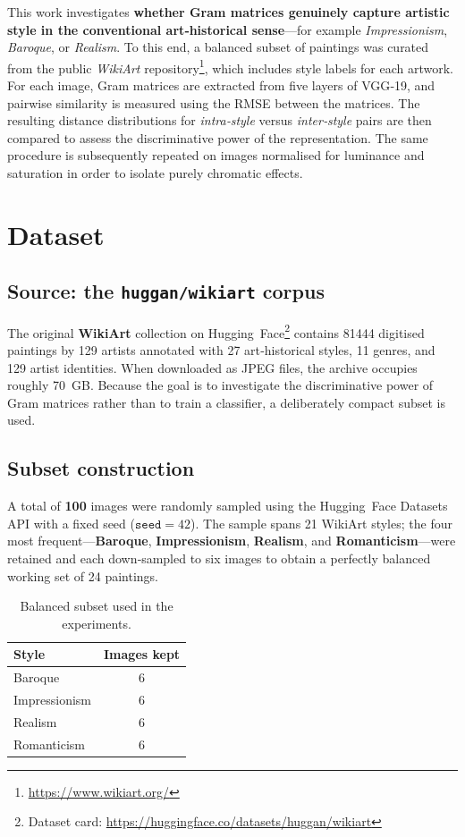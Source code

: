 \documentclass[a4paper,11pt]{article}
\begin{document}
\medskip
This work investigates \textbf{whether Gram matrices genuinely capture artistic style in the conventional art‑historical sense}—for example \emph{Impressionism}, \emph{Baroque}, or \emph{Realism}. To this end, a balanced subset of paintings was curated from the public \emph{WikiArt} repository\footnote{\url{https://www.wikiart.org/}}, which includes style labels for each artwork. For each image, Gram matrices are extracted from five layers of VGG‑19, and pairwise similarity is measured using the RMSE between the matrices. The resulting distance distributions for \emph{intra‑style} versus \emph{inter‑style} pairs are then compared to assess the discriminative power of the representation. The same procedure is subsequently repeated on images normalised for luminance and saturation in order to isolate purely chromatic effects.

\section{Dataset}
\subsection{Source: the \texttt{huggan/wikiart} corpus}
The original \textbf{WikiArt} collection on Hugging~Face\footnote{Dataset card: \url{https://huggingface.co/datasets/huggan/wikiart}} contains \num{81444} digitised paintings by \num{129} artists annotated with \num{27} art‑historical styles, \num{11} genres, and \num{129} artist identities. When downloaded as JPEG files, the archive occupies roughly \SI{70}{GB}. Because the goal is to investigate the discriminative power of Gram matrices rather than to train a classifier, a deliberately compact subset is used.

\subsection{Subset construction}
A total of \textbf{100} images were randomly sampled using the Hugging~Face Datasets API with a fixed seed ($\texttt{seed}=42$). The sample spans \num{21} WikiArt styles; the four most frequent—\textbf{Baroque}, \textbf{Impressionism}, \textbf{Realism}, and \textbf{Romanticism}—were retained and each down‑sampled to six images to obtain a perfectly balanced working set of \num{24} paintings.

\begin{table}[htbp]
    \centering
    \begin{tabular}{lc}
        \toprule
        \textbf{Style} & \textbf{Images kept} \\
        \midrule
        Baroque        & 6 \\
        Impressionism  & 6 \\
        Realism        & 6 \\
        Romanticism    & 6 \\
        \bottomrule
    \end{tabular}
    \caption{Balanced subset used in the experiments.}
    \label{tab:subset}
\end{table}
\end{document}
